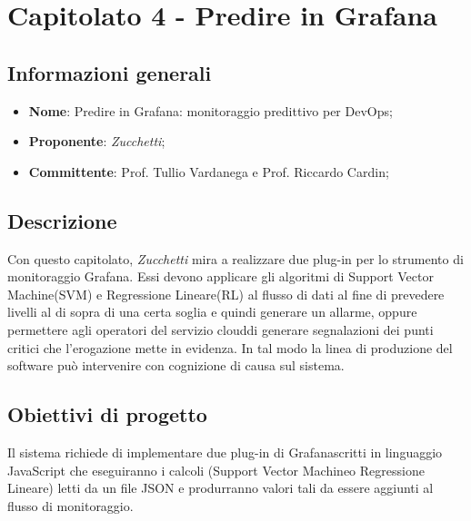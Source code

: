 \section{Capitolato 4 - Predire in Grafana}

\subsection{Informazioni generali}
\begin{itemize}
	\item \textbf{Nome}: Predire in Grafana\glo: monitoraggio predittivo per DevOps\glo;
	\item \textbf{Proponente}: \textit{Zucchetti};
	\item \textbf{Committente}: Prof. Tullio Vardanega e Prof. Riccardo Cardin;
\end{itemize}

\subsection{Descrizione}
Con questo capitolato\glo, \textit{Zucchetti} mira a realizzare due plug-in per lo strumento di monitoraggio Grafana\glo. Essi devono applicare gli algoritmi di Support Vector Machine\glosp (SVM) e Regressione Lineare\glosp (RL) al flusso di dati al fine di prevedere livelli al di sopra di una certa soglia e quindi generare un allarme, oppure permettere agli operatori del servizio cloud\glosp di generare segnalazioni dei punti critici che l’erogazione mette in evidenza. In tal modo la linea di produzione del software può intervenire con cognizione di causa sul sistema.

\subsection{Obiettivi di progetto}
Il sistema richiede di implementare due plug-in di Grafana\glosp scritti in linguaggio JavaScript che eseguiranno i calcoli (Support Vector Machine\glosp o Regressione Lineare\glo) letti da un file JSON e produrranno valori tali da essere aggiunti al flusso di monitoraggio.

